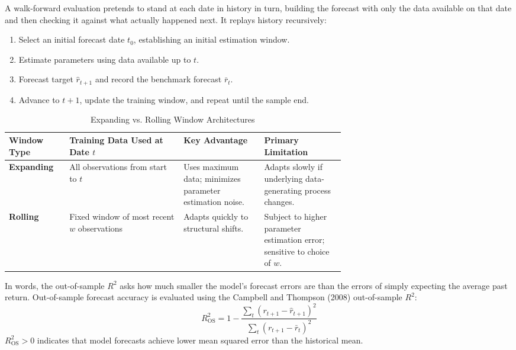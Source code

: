 A walk-forward evaluation pretends to stand at each date in history in turn, building the forecast with only the data available on that date and then checking it against what actually happened next. It replays history recursively:
\begin{enumerate}
  \item Select an initial forecast date $t_0$, establishing an initial estimation window.
  \item Estimate parameters using data available up to $t$.
  \item Forecast target $\hat{r}_{t+1}$ and record the benchmark forecast $\bar{r}_t$.
  \item Advance to $t+1$, update the training window, and repeat until the sample end.
\end{enumerate}

\begin{table}[htbp]
\centering
\small
\caption{Expanding vs. Rolling Window Architectures}
\label{tab:09-windows}
\begin{tabularx}{0.95\linewidth}{@{}>{\raggedright\arraybackslash}p{0.18\linewidth}>{\raggedright\arraybackslash}X>{\raggedright\arraybackslash}p{0.24\linewidth}>{\raggedright\arraybackslash}p{0.24\linewidth}@{}}
\toprule
Window Type & Training Data Used at Date $t$ & Key Advantage & Primary Limitation \\
\midrule
\textbf{Expanding} & All observations from start to $t$ & Uses maximum data; minimizes parameter estimation noise. & Adapts slowly if underlying data-generating process changes. \\
\textbf{Rolling} & Fixed window of most recent $w$ observations & Adapts quickly to structural shifts. & Subject to higher parameter estimation error; sensitive to choice of $w$. \\
\bottomrule
\end{tabularx}
\end{table}

In words, the out-of-sample $R^2$ asks how much smaller the model's forecast errors are than the errors of simply expecting the average past return. Out-of-sample forecast accuracy is evaluated using the Campbell and Thompson (2008) out-of-sample $R^2$:
\begin{equation}
  R^2_{\text{OS}} = 1 - \frac{\sum_{t} \left( r_{t+1} - \hat{r}_{t+1} \right)^2}{\sum_{t} \left( r_{t+1} - \bar{r}_t \right)^2}
  \label{eq:09-r2os}
\end{equation}
$R^2_{\text{OS}} > 0$ indicates that model forecasts achieve lower mean squared error than the historical mean.

